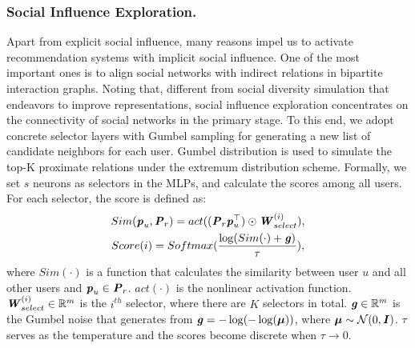\documentclass[letterpaper]{article} %
\begin{document}
\subsubsection{Social Influence Exploration.}
Apart from explicit social influence, many reasons impel us to activate recommendation systems with implicit social influence. One of the most important ones is to align social networks with indirect relations in bipartite interaction graphs. Noting that, different from social diversity simulation that endeavors to improve representations, social influence exploration concentrates on the connectivity of social networks in the primary stage. To this end, we adopt concrete selector layers with Gumbel sampling \cite{gumbel} for generating a new list of candidate neighbors for each user. Gumbel distribution is used to simulate the top-K proximate relations under the extremum distribution scheme. Formally, we set $s$ neurons as selectors in the MLPs, and calculate the scores among all users. For each selector, the score is defined as:
\begin{gather}
    Sim(\textbf{\textit{p}}_u,\textbf{\textit{P}}_r) = act((\textbf{\textit{P}}_r \textbf{\textit{p}}_u^{\top})\odot \textbf{\textit{W}}_{select}^{(i)}),\\
    Score(i) = Softmax(\frac{\log(Sim(\cdot)+\textbf{\textit{g}})}{\tau}),
\end{gather}
where $Sim(\cdot)$ is a function that calculates the similarity between user $u$ and all other users and $\textbf{\textit{p}}_u \in \textbf{\textit{P}}_r$. $act(\cdot)$ is the nonlinear activation function. $\textbf{\textit{W}}_{select}^{(i)} \in \mathbb{R}^m$ is the $i^{th}$ selector, where there are $K$ selectors in total. $\textbf{\textit{g}} \in \mathbb{R}^{m}$ is the Gumbel noise that generates from $\textbf{\textit{g}}=-\log(-\log(\boldsymbol{\mu}))$, where $\boldsymbol{\mu} \sim \mathcal{N}(0,\textbf{\textit{I}})$. $\tau$ serves as the temperature and the scores become discrete when $\tau \rightarrow 0$.
\end{document}
